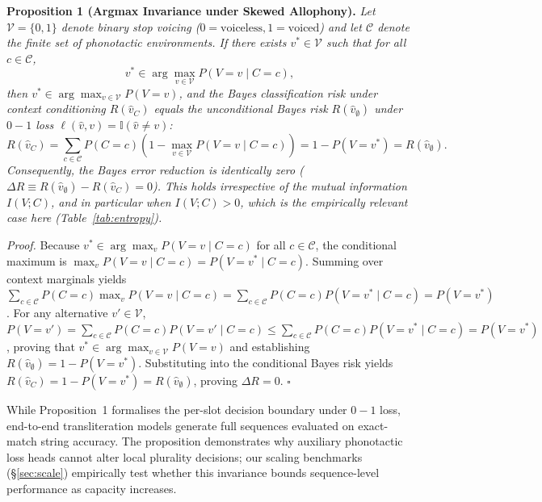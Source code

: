 \documentclass[11pt]{article}
\begin{document}
\vspace{0.4em}
\noindent\textbf{Proposition 1 (Argmax Invariance under Skewed Allophony).}\label{prop:argmax} \textit{Let $\mathcal{V} = \{0, 1\}$ denote binary stop voicing ($0 = \text{voiceless}, 1 = \text{voiced}$) and let $\mathcal{C}$ denote the finite set of phonotactic environments. If there exists $v^* \in \mathcal{V}$ such that for all $c \in \mathcal{C}$,
\begin{equation}
v^* \in \arg\max_{v \in \mathcal{V}} P(V=v \mid C=c),
\end{equation}
then $v^* \in \arg\max_{v \in \mathcal{V}} P(V=v)$, and the Bayes classification risk under context conditioning $R(\hat{v}_C)$ equals the unconditional Bayes risk $R(\hat{v}_\emptyset)$ under $0-1$ loss $\ell(\hat{v}, v) = \mathbb{I}(\hat{v} \ne v)$:
\begin{equation}
R(\hat{v}_C) = \sum_{c \in \mathcal{C}} P(C=c) \left(1 - \max_{v \in \mathcal{V}} P(V=v \mid C=c)\right) = 1 - P(V=v^*) = R(\hat{v}_\emptyset).
\end{equation}
Consequently, the Bayes error reduction is identically zero ($\Delta R \equiv R(\hat{v}_\emptyset) - R(\hat{v}_C) = 0$). This holds irrespective of the mutual information $I(V; C)$, and in particular when $I(V; C) > 0$, which is the empirically relevant case here (Table~\ref{tab:entropy}).}
\vspace{0.4em}

\noindent\textit{Proof.} Because $v^* \in \arg\max_v P(V=v \mid C=c)$ for all $c \in \mathcal{C}$, the conditional maximum is $\max_v P(V=v \mid C=c) = P(V=v^* \mid C=c)$. Summing over context marginals yields $\sum_{c \in \mathcal{C}} P(C=c) \max_v P(V=v \mid C=c) = \sum_{c \in \mathcal{C}} P(C=c) P(V=v^* \mid C=c) = P(V=v^*)$. For any alternative $v' \in \mathcal{V}$, $P(V=v') = \sum_{c \in \mathcal{C}} P(C=c) P(V=v' \mid C=c) \le \sum_{c \in \mathcal{C}} P(C=c) P(V=v^* \mid C=c) = P(V=v^*)$, proving that $v^* \in \arg\max_{v \in \mathcal{V}} P(V=v)$ and establishing $R(\hat{v}_\emptyset) = 1 - P(V=v^*)$. Substituting into the conditional Bayes risk yields $R(\hat{v}_C) = 1 - P(V=v^*) = R(\hat{v}_\emptyset)$, proving $\Delta R = 0$. \hfill $\square$

\vspace{0.3em}
While Proposition~1 formalises the per-slot decision boundary under $0-1$ loss, end-to-end transliteration models generate full sequences evaluated on exact-match string accuracy. The proposition demonstrates why auxiliary phonotactic loss heads cannot alter local plurality decisions; our scaling benchmarks (\S\ref{sec:scale}) empirically test whether this invariance bounds sequence-level performance as capacity increases.
\end{document}
